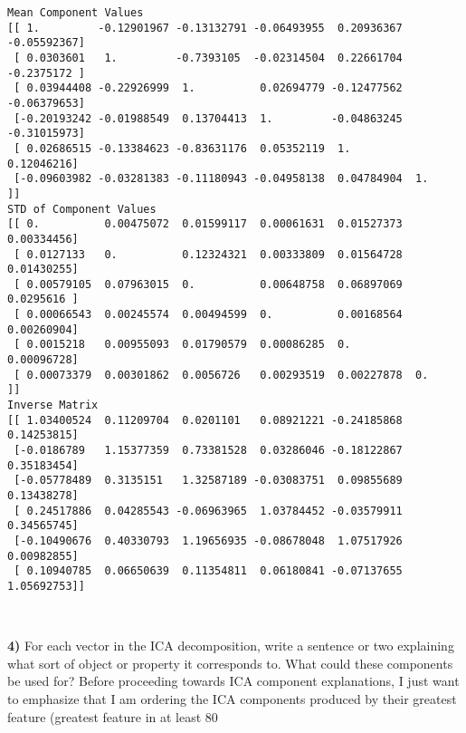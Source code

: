 \documentclass{article}
\begin{document}
    \begin{Verbatim}[commandchars=\\\{\}]
Mean Component Values
[[ 1.         -0.12901967 -0.13132791 -0.06493955  0.20936367 -0.05592367]
 [ 0.0303601   1.         -0.7393105  -0.02314504  0.22661704 -0.2375172 ]
 [ 0.03944408 -0.22926999  1.          0.02694779 -0.12477562 -0.06379653]
 [-0.20193242 -0.01988549  0.13704413  1.         -0.04863245 -0.31015973]
 [ 0.02686515 -0.13384623 -0.83631176  0.05352119  1.          0.12046216]
 [-0.09603982 -0.03281383 -0.11180943 -0.04958138  0.04784904  1.        ]]
STD of Component Values
[[ 0.          0.00475072  0.01599117  0.00061631  0.01527373  0.00334456]
 [ 0.0127133   0.          0.12324321  0.00333809  0.01564728  0.01430255]
 [ 0.00579105  0.07963015  0.          0.00648758  0.06897069  0.0295616 ]
 [ 0.00066543  0.00245574  0.00494599  0.          0.00168564  0.00260904]
 [ 0.0015218   0.00955093  0.01790579  0.00086285  0.          0.00096728]
 [ 0.00073379  0.00301862  0.0056726   0.00293519  0.00227878  0.        ]]
Inverse Matrix
[[ 1.03400524  0.11209704  0.0201101   0.08921221 -0.24185868  0.14253815]
 [-0.0186789   1.15377359  0.73381528  0.03286046 -0.18122867  0.35183454]
 [-0.05778489  0.3135151   1.32587189 -0.03083751  0.09855689  0.13438278]
 [ 0.24517886  0.04285543 -0.06963965  1.03784452 -0.03579911  0.34565745]
 [-0.10490676  0.40330793  1.19656935 -0.08678048  1.07517926  0.00982855]
 [ 0.10940785  0.06650639  0.11354811  0.06180841 -0.07137655  1.05692753]]
    \end{Verbatim}

    \begin{center}
    \end{center}
    { \hspace*{\fill} \\}
    
    \textbf{4)} For each vector in the ICA decomposition, write a sentence
or two explaining what sort of object or property it corresponds to.
What could these components be used for?
Before proceeding towards ICA component explanations, I just want to emphasize that I am ordering the ICA components produced by their greatest feature (greatest feature in at least 80%
\end{document}
